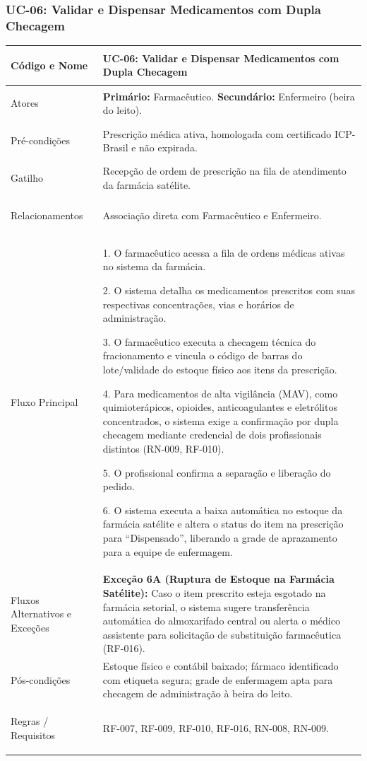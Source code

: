 \subsubsection{UC-06: Validar e Dispensar Medicamentos com Dupla Checagem}
\label{sec:uc06}

\begingroup
\small
\begin{tabularx}{\textwidth}{>{\bfseries\raggedright\arraybackslash}p{3.4cm} X}
\toprule
Código e Nome & UC-06: Validar e Dispensar Medicamentos com Dupla Checagem \\
\midrule
Atores & \textbf{Primário:} Farmacêutico. \textbf{Secundário:} Enfermeiro (beira do leito). \\
Pré-condições & Prescrição médica ativa, homologada com certificado ICP-Brasil e não expirada. \\
Gatilho & Recepção de ordem de prescrição na fila de atendimento da farmácia satélite. \\
Relacionamentos & Associação direta com Farmacêutico e Enfermeiro. \\
\midrule
Fluxo Principal & 
1. O farmacêutico acessa a fila de ordens médicas ativas no sistema da farmácia.\par
2. O sistema detalha os medicamentos prescritos com suas respectivas concentrações, vias e horários de administração.\par
3. O farmacêutico executa a checagem técnica do fracionamento e vincula o código de barras do lote/validade do estoque físico aos itens da prescrição.\par
4. Para medicamentos de alta vigilância (MAV), como quimioterápicos, opioides, anticoagulantes e eletrólitos concentrados, o sistema exige a confirmação por dupla checagem mediante credencial de dois profissionais distintos (RN-009, RF-010).\par
5. O profissional confirma a separação e liberação do pedido.\par
6. O sistema executa a baixa automática no estoque da farmácia satélite e altera o status do item na prescrição para ``Dispensado'', liberando a grade de aprazamento para a equipe de enfermagem. \\
\midrule
Fluxos Alternativos e Exceções & 
\textbf{Exceção 6A (Ruptura de Estoque na Farmácia Satélite):} Caso o item prescrito esteja esgotado na farmácia setorial, o sistema sugere transferência automática do almoxarifado central ou alerta o médico assistente para solicitação de substituição farmacêutica (RF-016). \\
\midrule
Pós-condições & Estoque físico e contábil baixado; fármaco identificado com etiqueta segura; grade de enfermagem apta para checagem de administração à beira do leito. \\
Regras / Requisitos & RF-007, RF-009, RF-010, RF-016, RN-008, RN-009. \\
\bottomrule
\end{tabularx}
\endgroup


